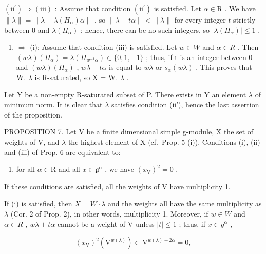\((\mathrm{ii}^{\prime}) \Longrightarrow (\mathrm{iii})\) : Assume that condition \((\mathrm{ii}^{\prime})\) is satisfied. Let \(\alpha \in \mathrm{R}\) . We have \(\| \lambda \| = \| \lambda - \lambda (H_{\alpha})\alpha \|\) , so \(\| \lambda - t\alpha \| < \| \lambda \|\) for every integer \(t\) strictly between 0 and \(\lambda (H_{\alpha})\) ; hence, there can be no such integers, so \(|\lambda (H_{\alpha})| \leq 1\) .

\begin{enumerate}
\def\labelenumi{(\roman{enumi})}
\setcounter{enumi}{2}
\tightlist
\item
  \(\Longrightarrow\) (i): Assume that condition (iii) is satisfied. Let \(w \in W\) and \(\alpha \in R\) . Then \((w\lambda)(H_{\alpha}) = \lambda(H_{w^{-1}\alpha}) \in \{0,1,-1\}\) ; thus, if t is an integer between 0 and \((w\lambda)(H_{\alpha})\) , \(w\lambda - t\alpha\) is equal to \(w\lambda\) or \(s_{\alpha}(w\lambda)\) . This proves that W. \(\lambda\) is R-saturated, so X = W. \(\lambda\) .
\end{enumerate}

Let Y be a non-empty R-saturated subset of P. There exists in Y an element \(\lambda\) of minimum norm. It is clear that \(\lambda\) satisfies condition (ii'), hence the last assertion of the proposition.

PROPOSITION 7. Let V be a finite dimensional simple g-module, X the set of weights of V, and \(\lambda\) the highest element of X (cf.~Prop. 5 (i)). Conditions (i), (ii) and (iii) of Prop. 6 are equivalent to:

\begin{enumerate}
\def\labelenumi{(\roman{enumi})}
\setcounter{enumi}{3}
\tightlist
\item
  for all \(\alpha \in \mathrm{R}\) and all \(x \in \mathfrak{g}^{\alpha}\) , we have \((x_{\mathrm{V}})^2 = 0\) .
\end{enumerate}

If these conditions are satisfied, all the weights of V have multiplicity 1.

If (i) is satisfied, then \(X = W \cdot \lambda\) and the weights all have the same multiplicity as \(\lambda\) (Cor. 2 of Prop. 2), in other words, multiplicity 1. Moreover, if \(w \in W\) and \(\alpha \in R\) , \(w\lambda + t\alpha\) cannot be a weight of V unless \(|t| \leq 1\) ; thus, if \(x \in g^{\alpha}\) ,

\[
(x _ {\mathrm{V}}) ^ {2} (\mathrm{V} ^ {w (\lambda)}) \subset \mathrm{V} ^ {w (\lambda) + 2 \alpha} = 0,
\]

